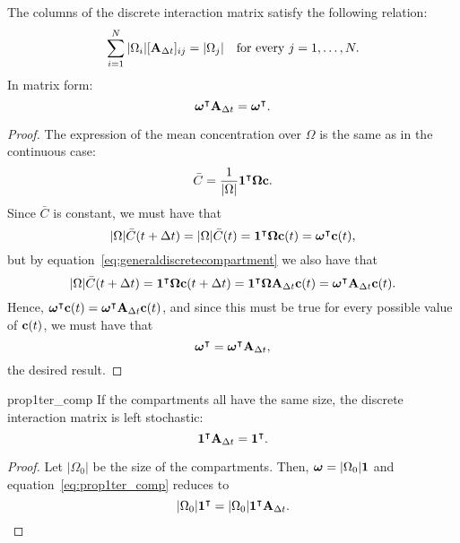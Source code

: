 \begin{property} \label{prop1ter_comp} \label{prop2_discr_comp}
	The columns of the discrete interaction matrix satisfy the following relation:
	\begin{equation}
		\sum_{i=1}^N |\Omega_i|  [\mathbf A_{\Delta t}]_{ij} = |\Omega_j| \quad \mbox{for every } j=1,\dots,N.
	\end{equation}
	In matrix form:
	\begin{equation}
		\boldsymbol \omega^\intercal \mathbf A_{\Delta t} = \boldsymbol \omega^\intercal .
	\end{equation}
\end{property}
\begin{proof}
	The expression of the mean concentration over $\Omega$ is the same as in the continuous case:
	\begin{equation}
		\bar C = \frac{1}{|\Omega|} \mathbf 1^\intercal \boldsymbol \Omega \mathbf c.
	\end{equation}
	Since $\bar C$ is constant, we must have that
	\begin{equation}
		|\Omega| \bar C(t+\Delta t) = |\Omega| \bar C(t) = \mathbf1^\intercal \boldsymbol \Omega \mathbf c(t) = \boldsymbol \omega^\intercal \mathbf c(t),
	\end{equation}
	but by equation~\eqref{eq:generaldiscretecompartment} we also have that
	\begin{equation}
		|\Omega| \bar C(t+\Delta t) = \mathbf1^\intercal \boldsymbol \Omega \mathbf c(t+\Delta t) = \mathbf1^\intercal \boldsymbol \Omega \mathbf A_{\Delta t} \mathbf c(t) = \boldsymbol \omega^\intercal \mathbf A_{\Delta t} \mathbf c(t).
	\end{equation}
	Hence, $\boldsymbol \omega^\intercal \mathbf c(t) = \boldsymbol \omega^\intercal \mathbf A_{\Delta t} \mathbf c(t)$, and since this must be true for every possible value of $\mathbf c(t)$, we must have that
	\begin{equation} \label{eq:prop1ter_comp}
		\boldsymbol \omega^\intercal = \boldsymbol \omega^\intercal \mathbf A_{\Delta t},
	\end{equation}
	the desired result.
\end{proof}
\begin{corollary}{prop1ter_comp} \label{corollary2}
	If the compartments all have the same size, the discrete interaction matrix is  left stochastic:
	\begin{equation}
		\mathbf 1^\intercal \mathbf A_{\Delta t} = \mathbf 1^\intercal.
	\end{equation}
\end{corollary}
\begin{proof}
	Let $|\Omega_0|$ be the size of the compartments. Then, $\boldsymbol \omega = |\Omega_0| \mathbf 1$ and equation~\eqref{eq:prop1ter_comp} reduces to
	\begin{equation}
		|\Omega_0| \mathbf 1^\intercal = |\Omega_0| \mathbf 1^\intercal \mathbf A_{\Delta t}.
	\end{equation}
\end{proof}
